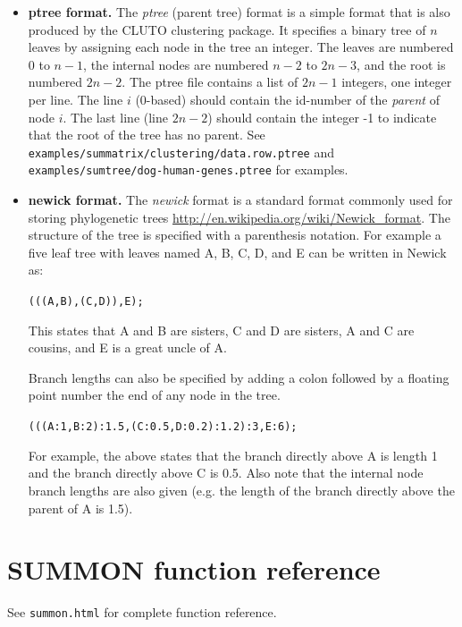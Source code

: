 \documentclass[12pt]{article}
\newcommand{\code}[1]{{\tt #1}}
\begin{document}
\begin{itemize}

    \item {\bf ptree format.}
    The {\em ptree} (parent tree) format is a simple format that is also produced by the
    CLUTO clustering package.  It specifies a binary tree of $n$ leaves by assigning
    each node in the tree an integer.  The leaves are numbered $0$ to $n-1$, the
    internal nodes are numbered $n-2$ to $2n-3$, and the root is
    numbered $2n-2$.  The ptree file contains a list of
    $2n-1$ integers, one integer per line.  The line $i$ (0-based) should contain
    the id-number of the {\em parent} of node $i$.  The last line (line $2n-2$) 
    should contain the integer -1 to indicate that the root of the tree has no
    parent.  See 
    \code{examples/summatrix/clustering/data.row.ptree} and
    \code{examples/sumtree/dog-human-genes.ptree} for examples.

    
    \item {\bf newick format.}
    The {\em newick} format is a standard format commonly used for storing
    phylogenetic trees \url{http://en.wikipedia.org/wiki/Newick_format}.  The
    structure of the tree is specified with a parenthesis notation.  For example a
    five leaf tree with leaves named A, B, C, D, and E can be written in Newick as:

    \code{(((A,B),(C,D)),E);}

    This states that A and B are sisters, C and D are sisters, A and C are cousins,
    and E is a great uncle of A.

    Branch lengths can also be specified by adding a
    colon followed by a floating point number the end of any node in the tree.

    \code{(((A:1,B:2):1.5,(C:0.5,D:0.2):1.2):3,E:6);}

    For example, the above states that the branch directly above A is length 1 and
    the branch directly above C is 0.5.  Also note that the internal node branch 
    lengths are also given (e.g. the length of the branch directly above the
    parent of A is 1.5).

\end{itemize}

\section{SUMMON function reference}

See \code{summon.html} for complete function reference.
\end{document}
